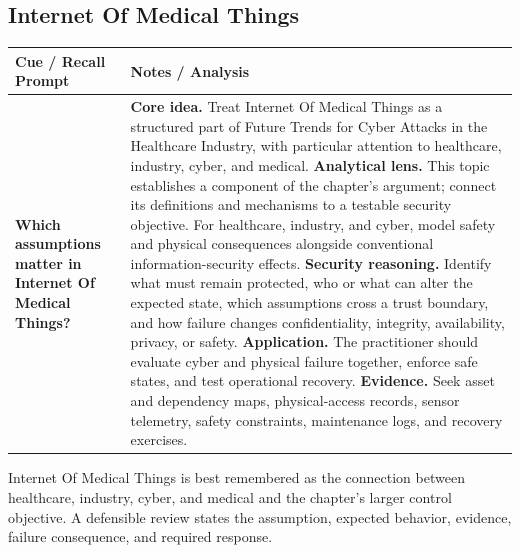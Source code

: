 \documentclass[11pt]{article}
\newcommand{\CornellHeader}{%
\rowcolor{Navy}\color{white}\bfseries Cue / Recall Prompt & \color{white}\bfseries Notes / Analysis\\\hline}
\newcommand{\CornellRow}[2]{%
\cellcolor{CueGray}\RaggedRight\textbf{#1} & \RaggedRight #2\\\hline}
\begin{document}
\subsection*{Internet Of Medical Things}
\begin{longtable}{>{\RaggedRight\arraybackslash}p{}|>{\RaggedRight\arraybackslash}p{}}
\CornellHeader
\CornellRow{Which assumptions matter in Internet Of Medical Things?}{\textbf{Core idea.} Treat Internet Of Medical Things as a structured part of Future Trends for Cyber Attacks in the Healthcare Industry, with particular attention to healthcare, industry, cyber, and medical. \textbf{Analytical lens.} This topic establishes a component of the chapter's argument; connect its definitions and mechanisms to a testable security objective. For healthcare, industry, and cyber, model safety and physical consequences alongside conventional information-security effects. \textbf{Security reasoning.} Identify what must remain protected, who or what can alter the expected state, which assumptions cross a trust boundary, and how failure changes confidentiality, integrity, availability, privacy, or safety. \textbf{Application.} The practitioner should evaluate cyber and physical failure together, enforce safe states, and test operational recovery. \textbf{Evidence.} Seek asset and dependency maps, physical-access records, sensor telemetry, safety constraints, maintenance logs, and recovery exercises.}
\end{longtable}
\begin{topicsummary}
Internet Of Medical Things is best remembered as the connection between healthcare, industry, cyber, and medical and the chapter's larger control objective. A defensible review states the assumption, expected behavior, evidence, failure consequence, and required response.
\end{topicsummary}
\end{document}
